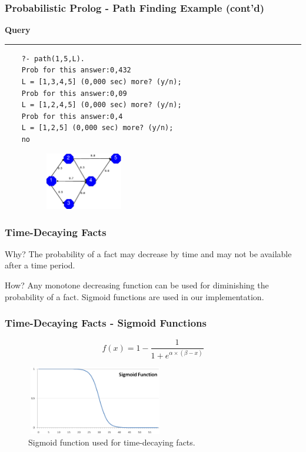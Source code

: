 \documentclass{beamer}
\newenvironment{mylisting}
{\begin{list}{}{\setlength{\leftmargin}{1em}}\item\scriptsize\bfseries}
{\end{list}}
\begin{document}
\begin{frame}[fragile]
	\frametitle{Probabilistic Prolog - Path Finding Example (cont'd)}
	\begin{mylisting}
	Query
	\vspace*{2px}\hrule
	\begin{verbatim}
	?- path(1,5,L).
	Prob for this answer:0,432
	L = [1,3,4,5] (0,000 sec) more? (y/n);
	Prob for this answer:0,09
	L = [1,2,4,5] (0,000 sec) more? (y/n);
	Prob for this answer:0,4
	L = [1,2,5] (0,000 sec) more? (y/n);
	no
	\end{verbatim}
	\end{mylisting}
	\begin{figure}[ht]
	\begin{center}
	\includegraphics[width=50mm,height=25mm]{../img/graph.eps}
	\end{center}
	\end{figure}

\end{frame}

\begin{frame}[fragile]
	\frametitle{Time-Decaying Facts}
  
  \begin{block}{Why?}
  	The probability of a fact may decrease by time and may not be available after a time period.
  \end{block}
  
  \begin{block}{How?}
	Any monotone decreasing function can be used for diminishing the probability of a fact.
	Sigmoid functions are used in our implementation.
  \end{block}
	
\end{frame}

\begin{frame}[fragile]
	\frametitle{Time-Decaying Facts - Sigmoid Functions}
	\begin{equation}
	\label{sigmoid}
	\nonumber f(x) = 1- \frac{1}{1+e^{\alpha\times(\beta-x)}}
	\end{equation}
	
	\begin{figure}[ht]
	\begin{center}
	\includegraphics[width=60mm,height=30mm]{../img/sigmoid.eps}
	\caption{Sigmoid function used for time-decaying facts.}
	\label{fig:sigmoid}
	\end{center}
	\end{figure}
	
\end{frame}
\end{document}
